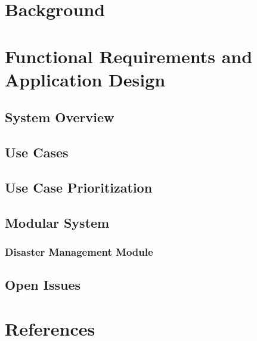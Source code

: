 \documentclass[a4paper,12pt]{article}
\begin{document}
	\section{Background}	
	
	
	
	\section{Functional Requirements and Application Design}
	
		\subsection{System Overview}
		
		\subsection{Use Cases}
		
		
		\subsection{Use Case Prioritization}
		
		
		\subsection{Modular System}		
			\subsubsection{Disaster Management Module}
			
		\subsection{Open Issues}
		
	
	
	\section{References}
	
	
	
\end{document}
